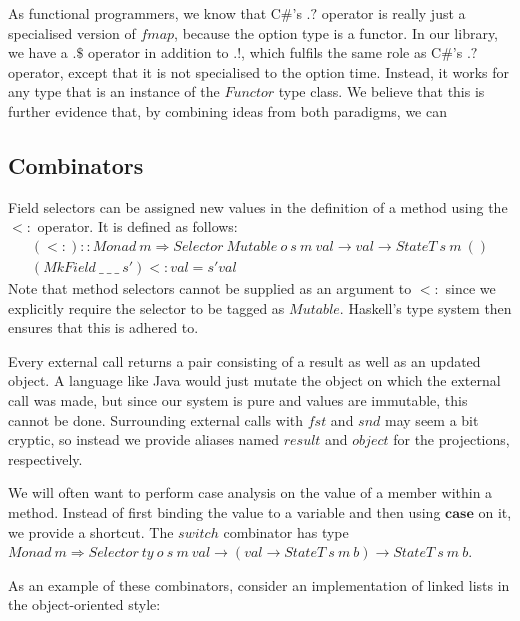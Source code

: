 As functional programmers, we know that C\#'s $.?$ operator is really just a specialised version of $\mathit{fmap}$, because the option type is a functor. In our library, we have a $.\$$ operator in addition to $.!$, which fulfils the same role as C\#'s $.?$ operator, except that it is not specialised to the option time. Instead, it works for any type that is an instance of the $\mathit{Functor}$ type class. We believe that this is further evidence that, by combining ideas from both paradigms, we can 

\subsection{Combinators}

Field selectors can be assigned new values in the definition of a method using the $<:$ operator. It is defined as follows: 
\begin{displaymath}
\begin{array}{l}
(<:)  ::  \mathit{Monad}~m \Rightarrow \mathit{Selector}~\mathit{Mutable}~o~s~m~\mathit{val} \to \mathit{val} \to \mathit{StateT}~s~m~()\\
(\mathit{MkField}~\_~\_~\_~s') <: val  =  s' val
\end{array}
\end{displaymath}
Note that method selectors cannot be supplied as an argument to $<:$ since we explicitly require the selector to be tagged as $\mathit{Mutable}$. Haskell's type system then ensures that this is adhered to.

Every external call returns a pair consisting of a result as well as an updated object. A language like Java would just mutate the object on which the external call was made, but since our system is pure and values are immutable, this cannot be done. Surrounding external calls with $\mathit{fst}$ and $\mathit{snd}$ may seem a bit cryptic, so instead we provide aliases named $\mathit{result}$ and $\mathit{object}$ for the projections, respectively. 

We will often want to perform case analysis on the value of a member within a method. Instead of first binding the value to a variable and then using $\mathbf{case}$ on it, we provide a shortcut. The $\mathit{switch}$ combinator has type $\mathit{Monad}~m \Rightarrow \mathit{Selector}~\mathit{ty}~o~s~m~\mathit{val} \to (\mathit{val} \to \mathit{StateT}~s~m~b) \to \mathit{StateT}~s~m~b$.

As an example of these combinators, consider an implementation of linked lists in the object-oriented style:

